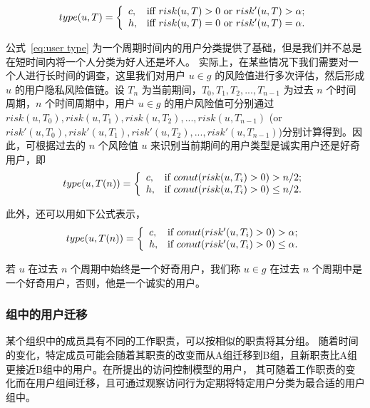 \begin{equation}\label{eq:user type}
type(u,T)=
\left\{
\begin{array}{ll}
c, & \hbox{iff $risk(u,T) > 0$ or $risk'(u,T)>\alpha$;} \\
h, & \hbox{iff  $risk(u,T) = 0$ or $risk'(u,T)=\alpha$.} \\
\end{array}
\right.
\end{equation}

公式~\ref{eq:user type} 为一个周期时间内的用户分类提供了基础，但是我们并不总是在短时间内将一个人分类为好人还是坏人。 实际上，在某些情况下我们需要对一个人进行长时间的调查，这里我们对用户 $u \in g$ 的风险值进行多次评估，然后形成 $u$ 的用户隐私风险值链。设 $T_n$ 为当前期间，$T_0, T_1, T_2, ..., T_{n-1}$ 为过去 $n$ 个时间周期，$n$ 个时间周期中，用户 $u \in g$ 的用户风险值可分别通过 $risk(u,T_0),risk(u,T_1),risk(u,T_2),..., risk(u,T_{n-1})$ (or $risk'(u,T_0), risk'(u,T_1), risk'(u,T_2), ..., risk'(u,T_{n-1})$)分别计算得到。因此，可根据过去的 $n$ 个风险值 $u$ 来识别当前期间的用户类型是诚实用户还是好奇用户，即
\begin{equation}\label{eq:user type Tn 1}
type(u,T(n))=
\left\{
\begin{array}{ll}
c, & \hbox{if $conut(risk(u,T_i) > 0) > n/2$;} \\
h, & \hbox{if $conut(risk(u,T_i) > 0) \leq n/2$.} \\
\end{array}
\right.
\end{equation}

此外，还可以用如下公式表示，
\begin{equation}\label{eq:user type Tn 2}
type(u,T(n))=
\left\{
\begin{array}{ll}
c, & \hbox{if $conut(risk'(u,T_i) > 0) > \alpha$;} \\
h, & \hbox{if $conut(risk'(u,T_i) > 0) \leq \alpha$.} \\
\end{array}
\right.
\end{equation}

若 $u$ 在过去 $n$ 个周期中始终是一个好奇用户，我们称 $u \in g$ 在过去 $n$ 个周期中是一个好奇用户，否则，他是一个诚实的用户。

\subsubsection{组中的用户迁移}
某个组织中的成员具有不同的工作职责，可以按相似的职责将其分组。 随着时间的变化，特定成员可能会随着其职责的改变而从A组迁移到B组，且新职责比A组更接近B组中的用户。在所提出的访问控制模型的用户， 其可随着工作职责的变化而在用户组间迁移，且可通过观察访问行为定期将特定用户分类为最合适的用户组中。

